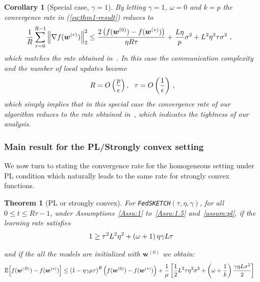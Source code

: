 \documentclass[sigconf, anonymous, review]{acmart}
\newtheorem{theorem}{Theorem}
\newtheorem{corollary}{Corollary}
\begin{document}
\begin{corollary}[Special case, $\gamma=1$]
By letting $\gamma=1$, $\omega=0$ and $k=p$ the convergence rate in (\ref{eq:thm1-result}) reduces to 
\begin{align}\notag
     \frac{1}{R}\sum_{r=0}^{R-1}\left\|\nabla f({\boldsymbol{w}}^{(r)})\right\|_2^2&\leq \frac{2\left(f(\boldsymbol{w}^{(0)})-f(\boldsymbol{w}^{(*)})\right)}{\eta R\tau}+\frac{L\eta }{p}\sigma^2+{L^2\eta^2\tau }\sigma^2 \ ,
\end{align}
which matches the rate  obtained in~\cite{wang2018cooperative}. In this case the communication complexity and the number of local updates become 
\begin{align}\notag
    {R}=O\left(\frac{p}{\epsilon}\right), \:\:\: \tau=O\left(\frac{1}{\epsilon}\right) \, ,
\end{align}
which simply implies  that in this special case the convergence rate of our algorithm reduces to the  rate obtained in~\cite{wang2018cooperative}, which indicates the tightness of  our analysis.
\end{corollary}



\subsubsection{Main result for the PL/Strongly convex setting}
 
We now turn to stating the convergence rate for the homogeneous setting under PL condition which naturally leads to the same rate for strongly convex functions.
\begin{theorem}[PL or strongly convex]\label{thm:pl-iid}
For \texttt{FedSKETCH}$(\tau, \eta, \gamma)$, for all $0\leq t\leq R\tau-1$,  under Assumptions~\ref{Assu:1} to~\ref{Assu:1.5} and~\ref{assum:pl}, if the learning rate satisfies 
\begin{align}\notag
   1\geq {\tau^2 L^2\eta^2}+\left(\omega+1\right){\eta\gamma L}{\tau}  \
\end{align}

and if the all the models are initialized with $\boldsymbol{w}^{(0)}$ we obtain:
\begin{align}\notag
        \mathbb{E}\Big[f({\boldsymbol{w}}^{(R)})-f({\boldsymbol{w}}^{(*)})\Big]&\leq \left(1-\eta\gamma{\mu\tau}\right)^R\left(f(\boldsymbol{w}^{(0)})-f(\boldsymbol{w}^{(*)})\right)+\frac{1}{{\mu}}\left[\frac{1}{2} L^2\tau\eta^2\sigma^2+\left(\omega+\frac{1}{k}\right)\frac{\gamma\eta L\sigma^2}{2}\right]
\end{align}
\end{theorem}
\end{document}
